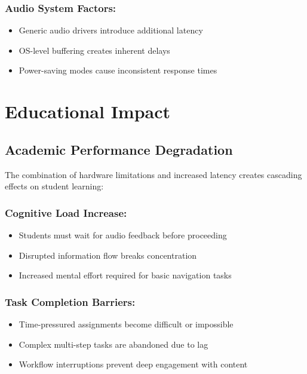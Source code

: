 \subsubsection{Audio System Factors:}

\begin{itemize}
	\item Generic audio drivers introduce additional \gls{latency} \supercite{ASIO4ALL2023Latency}
	\item OS-level buffering creates inherent delays \supercite{LinuxAudioLatency}
	\item Power-saving modes cause inconsistent response times \supercite{WindowsPowerManagement}
\end{itemize}


\section{Educational Impact}\label{educational-impact}

\subsection{Academic Performance Degradation}\label{academic-performance-degradation}

The combination of hardware limitations and increased latency creates cascading effects on student learning:

\subsubsection{Cognitive Load Increase:}
\begin{itemize}
	\item Students must wait for audio feedback before proceeding \supercite{Sweller1988CognitiveLoadTheory}
	\item Disrupted information flow breaks concentration \supercite{Parasuraman2008CognitiveWorkload}
	\item Increased mental effort required for basic \gls{navigation} tasks \supercite{Wickens2008MultipleResourceTheory}
\end{itemize}

\subsubsection{Task Completion Barriers:}

\begin{itemize}
	\item Time-pressured assignments become difficult or impossible \supercite{Adams2000ImpactOfTechnology}
	\item Complex multi-step tasks are abandoned due to lag \supercite{Kirschner2006WhyMinimalGuidance}
	\item Workflow interruptions prevent deep engagement with content \supercite{Pashler1994DualTaskInterference}
\end{itemize}


